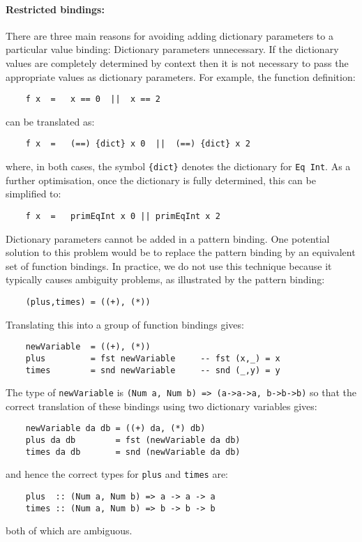\paragraph{Restricted bindings:}
There are three main reasons for avoiding adding dictionary  parameters
to a particular value binding:
\BI
\IT  Dictionary parameters unnecessary.  If the dictionary  values  are
     completely determined by context then it is not necessary to  pass
     the appropriate values as dictionary parameters.  For example, the
     function definition:
\begin{verbatim}
    f x  =   x == 0  ||  x == 2
\end{verbatim}
     can be translated as:
\begin{verbatim}
    f x  =   (==) {dict} x 0  ||  (==) {dict} x 2
\end{verbatim}
     where, in both cases, the symbol \verb"{dict}" denotes the dictionary for
     \verb"Eq Int".  As a further optimisation, once the dictionary  is  fully
     determined, this can be simplified to:
\begin{verbatim}
    f x  =   primEqInt x 0 || primEqInt x 2
\end{verbatim}
\IT  Dictionary parameters cannot be added in a pattern  binding.   One
     potential solution to this problem would be to replace the pattern
     binding by an equivalent set of function bindings.   In  practice,
     we do not use this technique because it typically causes ambiguity
     problems, as illustrated by the pattern binding:
\begin{verbatim}
    (plus,times) = ((+), (*))
\end{verbatim}
     Translating this into a group of function bindings gives:
\begin{verbatim}
    newVariable  = ((+), (*))
    plus         = fst newVariable     -- fst (x,_) = x
    times        = snd newVariable     -- snd (_,y) = y
\end{verbatim}
     The type of \verb"newVariable" is 
     \verb"(Num a, Num b) => (a->a->a, b->b->b)" so
     that  the  correct  translation  of  these  bindings   using   two
     dictionary variables gives:
\begin{verbatim}
    newVariable da db = ((+) da, (*) db)
    plus da db        = fst (newVariable da db)
    times da db       = snd (newVariable da db)
\end{verbatim} 
     and hence the correct types for \verb"plus" and \verb"times" are:
\begin{verbatim} 
    plus  :: (Num a, Num b) => a -> a -> a
    times :: (Num a, Num b) => b -> b -> b
\end{verbatim}   
     both of which are ambiguous.

